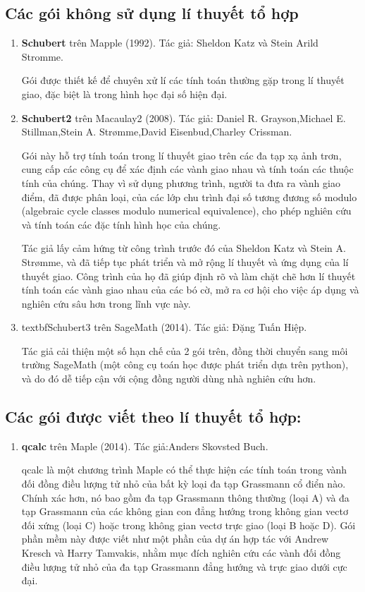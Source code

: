 \documentclass[11pt,a4paper]{book}
\begin{document}
\subsection{Các gói không sử dụng lí thuyết tổ hợp}

\begin{enumerate}
	\item \textbf{Schubert} trên Mapple (1992). Tác giả: Sheldon Katz và Stein Arild Stromme. 
	
	Gói được thiết kế để chuyên xử lí các tính toán thường gặp trong lí thuyết giao, đặc biệt là trong hình học đại số hiện đại.
	
	\item \textbf{Schubert2} trên Macaulay2 (2008). Tác giả: Daniel R. Grayson,Michael E. Stillman,Stein A. Strømme,David Eisenbud,Charley Crissman.
	
	Gói này hỗ trợ tính toán trong lí thuyết giao trên các đa tạp xạ ảnh trơn, cung cấp các công cụ để xác định các vành giao nhau và tính toán các thuộc tính của chúng. Thay vì sử dụng phương trình, người ta đưa ra vành giao điểm, đã được phân loại, của các lớp chu trình đại số tương đương số modulo (algebraic cycle classes modulo numerical equivalence), cho phép nghiên cứu và tính toán các đặc tính hình học của chúng.

    Tác giả lấy cảm hứng từ công trình trước đó của Sheldon Katz và Stein A. Strømme, và đã tiếp tục phát triển và mở rộng lí thuyết và ứng dụng của lí thuyết giao. Công trình của họ đã giúp định rõ và làm chặt chẽ hơn lí thuyết tính toán các vành giao nhau của các bó cờ, mở ra cơ hội cho việc áp dụng và nghiên cứu sâu hơn trong lĩnh vực này.

	\item textbf{Schubert3} trên SageMath (2014). Tác giả: Đặng Tuấn Hiệp. 
	
	Tác giả cải thiện một số hạn chế của 2 gói trên, đồng thời chuyển sang môi trường SageMath (một công cụ toán học được phát triển dựa trên python), và do đó dễ tiếp cận với cộng đồng người dùng nhà nghiên cứu hơn.
\end{enumerate}

\subsection{Các gói được viết theo lí thuyết tổ hợp:}

\begin{enumerate}
	\item \textbf{qcalc} trên Maple (2014). Tác giả:Anders Skovsted Buch. 
	
	qcalc là một chương trình Maple có thể thực hiện các tính toán trong vành đối đồng điều lượng tử nhỏ của bất kỳ loại đa tạp Grassmann cổ điển nào. Chính xác hơn, nó bao gồm đa tạp Grassmann thông thường (loại A) và đa tạp Grassmann của các không gian con đẳng hướng trong không gian vectơ đối xứng (loại C) hoặc trong không gian vectơ trực giao (loại B hoặc D). Gói phần mềm này được viết như một phần của dự án hợp tác với Andrew Kresch và Harry Tamvakis, nhằm mục đích nghiên cứu các vành đối đồng điều lượng tử nhỏ của đa tạp Grassmann đẳng hướng và trực giao dưới cực đại.
\end{enumerate}
\end{document}
